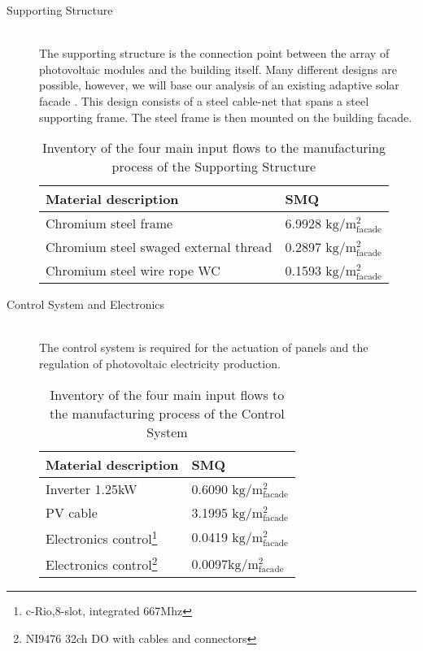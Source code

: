 \begin{description}
\item[Supporting Structure] \hfill \\
The supporting structure is the connection point between the array of photovoltaic modules and the building itself. Many different designs are possible, however, we will base our analysis of an existing adaptive solar facade \cite{nagy2015frontiers}. This design consists of a steel cable-net that spans a steel supporting frame. The steel frame is then mounted on the building facade.\\

\begin{table}[H]
\centering
\begin{tabular}{ll}
\hline
Material description & SMQ \\ \hline
Chromium steel frame & 6.9928 ${\mathrm{kg/m^2_{facade}}}$ \\
Chromium steel swaged external thread  &0.2897 ${\mathrm{kg/m^2_{facade}}}$\\
Chromium steel wire rope WC  & 0.1593 ${\mathrm{kg/m^2_{facade}}}$\\
\hline
\end{tabular}
\caption{Inventory of the four main input flows to the manufacturing process of the Supporting Structure}
\label{tab:StructureInv}
\end{table}

\item[Control System and Electronics] \hfill \\
The control system is required for the actuation of panels and the regulation of photovoltaic electricity production.\\

\begin{table}[H]
\centering
\begin{tabular}{ll}
\hline
Material description & SMQ \\ \hline
Inverter 1.25kW	 & 0.6090 ${\mathrm{kg/m^2_{facade}}}$ \\
PV cable  & 3.1995 ${\mathrm{kg/m^2_{facade}}}$\\
Electronics control\footnote{c-Rio,8-slot, integrated 667Mhz}& 0.0419 ${\mathrm{kg/m^2_{facade}}}$\\
Electronics control\footnote{NI9476 32ch DO with cables and connectors}& 0.0097${\mathrm{kg/m^2_{facade}}}$\\
\hline
\end{tabular}
\caption{Inventory of the four main input flows to the manufacturing process of the Control System}
\label{tab:ControlInv}
\end{table}


\end{description}
